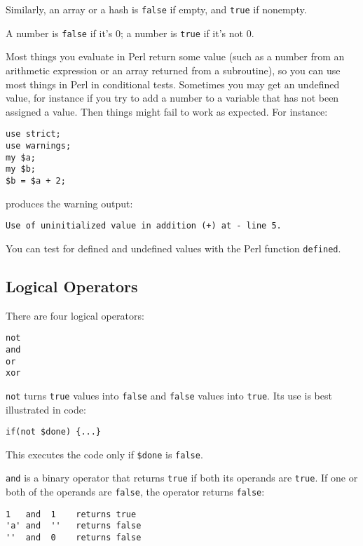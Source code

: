Similarly, an array or a hash is \verb|false| if empty, and \verb|true| if nonempty.

A number is \verb|false| if it's 0; a number is \verb|true| if it's not 0.

Most things you evaluate in Perl return some value (such as a number from an arithmetic expression or an array returned from a subroutine), so you can use most things in Perl in conditional tests. Sometimes you may get an undefined value, for instance if you try to add a number to a variable that has not been assigned a value. Then things might fail to work as expected. For instance:

\begin{lstlisting}
use strict;
use warnings;
my $a;
my $b;
$b = $a + 2;
\end{lstlisting}

produces the warning output:

\begin{lstlisting}
Use of uninitialized value in addition (+) at - line 5.
\end{lstlisting}

You can test for defined and undefined values with the Perl function \verb|defined|.

\subsection{Logical Operators}
There are four logical operators:

\begin{lstlisting}
not
and
or
xor
\end{lstlisting}

\verb|not| turns \verb|true| values into \verb|false| and \verb|false| values into \verb|true|. Its use is best illustrated in code:

\begin{lstlisting}
if(not $done) {...}
\end{lstlisting}

This executes the code only if \verb|$done| is \verb|false|.

\verb|and| is a binary operator that returns \verb|true| if both its operands are \verb|true|. If one or both of the operands are \verb|false|, the operator returns \verb|false|:

\begin{lstlisting}
1   and  1    returns true
'a' and  ''   returns false
''  and  0    returns false
\end{lstlisting}

